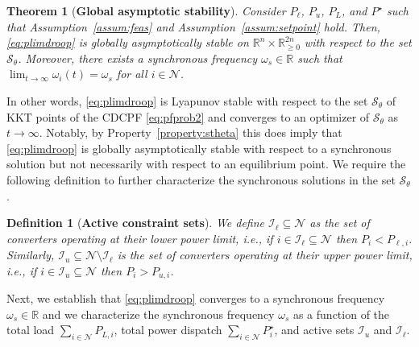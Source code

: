 \documentclass[twocolumn,twoside,journal]{IEEEtran}
\newcommand{\mc}{\mathcal}
\newtheorem{theorem}{Theorem}
\newtheorem{definition}{Definition}
\begin{document}
\begin{theorem}[\textbf{Global asymptotic stability}]\label{thm:GASpowerlimit}
    Consider $P_\ell$, $P_u$, $P_L$, and $P^\star$ such that Assumption~\ref{assum:feas} and Assumption~\ref{assum:setpoint} hold. Then, \eqref{eq:plimdroop} is globally asymptotically stable on $\mathbb{R}^n \times \mathbb{R}^{2n}_{\geq 0}$ with respect to the set  $\mathcal{S}_{\theta}$. Moreover, there exists a synchronous frequency $\omega_s \in \mathbb{R}$ such that $\lim_{t \rightarrow \infty} \omega_i(t) = \omega_{s}$ for all $i \in \mc N$.
\end{theorem}
In other words, \eqref{eq:plimdroop} is Lyapunov stable with respect to the set $\mathcal{S}_{\theta}$ of KKT points of the CDCPF \eqref{eq:pfprob2} and converges to an optimizer of $\mathcal{S}_{\theta}$ as $t\to\infty$. Notably, by Property~\ref{property:stheta} this does imply that \eqref{eq:plimdroop} is globally asymptotically stable with respect to a synchronous solution but not necessarily with respect to an equilibrium point. We require the following definition to further characterize the synchronous solutions in the set $\mathcal{S}_{\theta}$.
%
\begin{definition}[\textbf{Active constraint sets}] \label{def:activesets}
    We define $\mathcal{I}_{\ell} \subseteq \mc N$ as the set of converters operating at their lower power limit, i.e., if $i \in \mathcal{I}_{\ell} \subseteq \mathcal{N}$ then $P_i < P_{\ell, i}$. Similarly, $\mathcal{I}_{u} \subseteq \mc N \setminus \mathcal{I}_{\ell}$ is the set of converters operating at their upper power limit, i.e., if $i \in \mathcal{I}_{u} \subseteq \mathcal{N}$ then $P_i > P_{u, i}$.    
\end{definition}
%
Next, we establish that \eqref{eq:plimdroop} converges to a synchronous frequency $\omega_s \in \mathbb{R}$ and we characterize the synchronous frequency $\omega_s$ as a function of the total load $\sum_{i \in \mc N}  P_{L,i}$, total power dispatch $\sum_{i \in \mc N} P^\star_i$, and active sets $\mc I_u$ and $\mc I_\ell$.
\end{document}
